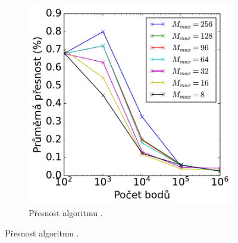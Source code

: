 \begin{figure}
\begin{subfigure}[t]{0.49\columnwidth}
\end{subfigure}
\hfill
\begin{subfigure}[t]{0.49\columnwidth}
    \centering  
    \includegraphics[scale=0.6]{obrazky-figures/benchmark/accuracy/normal/acccurucy_leaf_err_cases.pdf}
    \caption{Přesnost algoritmu .}


\end{subfigure}
\end{figure}
